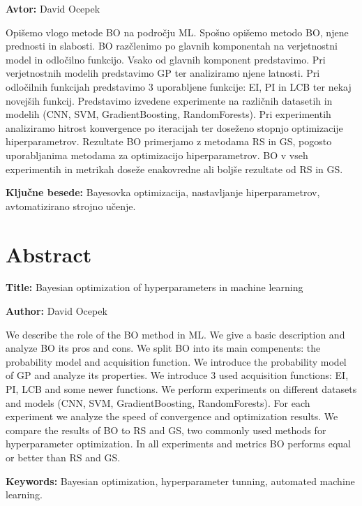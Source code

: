 \documentclass[a4paper, 12pt]{book}
\newcommand{\ttitleEn}{Bayesian optimization of hyperparameters in machine learning}
\newcommand{\tauthor}{David Ocepek}
\newcommand{\tkeywords}{Bayesovka optimizacija, nastavljanje hiperparametrov, avtomatizirano strojno učenje}
\newcommand{\tkeywordsEn}{Bayesian optimization,  hyperparameter tunning, automated machine learning}
\newcommand{\clearemptydoublepage}{\newpage{\pagestyle{empty}\cleardoublepage}}
\begin{document}
\noindent\textbf{Avtor:} \tauthor
\bigskip

\noindent 
Opišemo vlogo metode BO na področju ML.
Spošno opišemo metodo BO, njene prednosti in slabosti.
BO razčlenimo po glavnih komponentah na verjetnostni model in odločilno funkcijo.
Vsako od glavnih komponent predstavimo.
Pri verjetnostnih modelih predstavimo GP ter analiziramo njene latnosti.
Pri odločilnih funkcijah predstavimo 3 uporabljene funkcije: EI, PI in LCB ter nekaj novejših funkcij.
Predstavimo izvedene experimente na različnih datasetih in modelih (CNN, SVM, GradientBoosting, RandomForests).
Pri experimentih analiziramo hitrost konvergence po iteracijah ter doseženo stopnjo optimizacije hiperparametrov.
Rezultate BO primerjamo z metodama RS in GS, pogosto uporabljanima metodama za optimizacijo hiperparametrov. 
BO v vseh experimentih in metrikah doseže enakovredne ali boljše rezultate od RS in GS.

\bigskip

\noindent\textbf{Ključne besede:} \tkeywords.
\clearemptydoublepage

\chapter*{Abstract}

\noindent\textbf{Title:} \ttitleEn
\bigskip

\noindent\textbf{Author:} \tauthor
\bigskip

\noindent We describe the role of the BO method in ML.
We give a basic description and analyze BO its pros and cons.
We split BO into its main compenents: the probability model and acquisition function.
We introduce the probability model of GP and analyze its properties.
We introduce 3 used acquisition functions: EI, PI, LCB and some newer functions.
We perform experiments on different datasets and models (CNN, SVM, GradientBoosting, RandomForests).
For each experiment we analyze the speed of convergence and optimization results.
We compare the results of BO to RS and GS, two commonly used methods for hyperparameter optimization.
In all experiments and metrics BO performs equal or better than RS and GS.
\bigskip

\noindent\textbf{Keywords:} \tkeywordsEn.
\clearemptydoublepage
\end{document}
